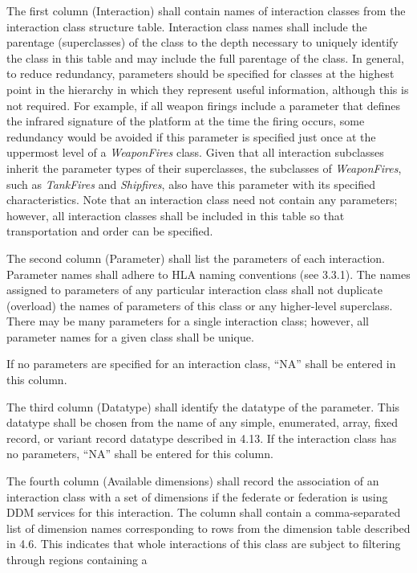 The first column (Interaction) shall contain names of interaction classes from the interaction class structure table. Interaction class names shall include the parentage (superclasses) of the class to the depth necessary to uniquely identify the class in this table and may include the full parentage of the class. In general, to reduce redundancy, parameters should be specified for classes at the highest point in the hierarchy in which they represent useful information, although this is not required. For example, if all weapon firings include a parameter that defines the infrared signature of the platform at the time the firing occurs, some redundancy would be avoided if this parameter is specified just once at the uppermost level of a \textit{WeaponFires} class. Given that all interaction subclasses inherit the parameter types of their superclasses, the subclasses of \textit{WeaponFires}, such as \textit{TankFires} and \textit{Shipfires}, also have this parameter with its specified characteristics. Note that an interaction class need not contain any parameters; however, all interaction classes shall be included in this table so that transportation and order can be specified.

The second column (Parameter) shall list the parameters of each interaction. Parameter names shall adhere to HLA naming conventions (see 3.3.1). The names assigned to parameters of any particular interaction class shall not duplicate (overload) the names of parameters of this class or any higher-level superclass. There may be many parameters for a single interaction class; however, all parameter names for a given class shall be unique.

If no parameters are specified for an interaction class, ``NA'' shall be entered in this column.

The third column (Datatype) shall identify the datatype of the parameter. This datatype shall be chosen from the name of any simple, enumerated, array, fixed record, or variant record datatype described in 4.13. If the interaction class has no parameters, ``NA'' shall be entered for this column.

The fourth column (Available dimensions) shall record the association of an interaction class with a set of dimensions if the federate or federation is using DDM services for this interaction. The column shall contain a comma-separated list of dimension names corresponding to rows from the dimension table described in 4.6. This indicates that whole interactions of this class are subject to filtering through regions containing a

